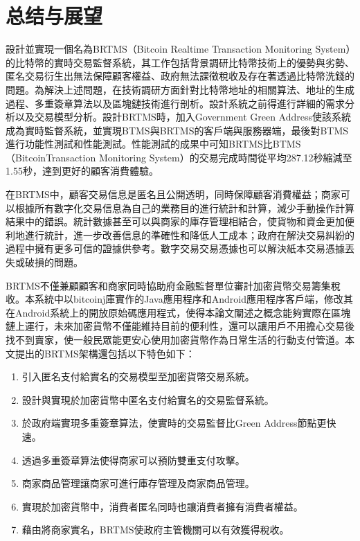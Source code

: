  
\chapter{总结与展望}
設計並實現一個名為BRTMS（Bitcoin Realtime Transaction Monitoring System）的比特幣的實時交易監督系統，其工作包括背景調研比特幣技術上的優勢與劣勢、匿名交易衍生出無法保障顧客權益、政府無法課徵稅收及存在著透過比特幣洗錢的問題。為解決上述問題，在技術調研方面針對比特幣地址的相關算法、地址的生成過程、多重簽章算法以及區塊鏈技術進行剖析。設計系統之前得進行詳細的需求分析以及交易模型分析。設計BRTMS時，加入Government Green Address使該系統成為實時監督系統，並實現BTMS與BRTMS的客戶端與服務器端，最後對BTMS進行功能性測試和性能測試。性能測試的成果中可知BRTMS比BTMS（BitcoinTransaction Monitoring System）的交易完成時間從平均287.12秒縮減至1.55秒，達到更好的顧客消費體驗。

在BRTMS中，顧客交易信息是匿名且公開透明，同時保障顧客消費權益；商家可以根據所有數字化交易信息為自己的業務目的進行統計和計算，減少手動操作計算結果中的錯誤。統計數據甚至可以與商家的庫存管理相結合，使貨物和資金更加便利地進行統計，進一步改善信息的準確性和降低人工成本；政府在解決交易糾紛的過程中擁有更多可信的證據供參考。數字交易交易憑據也可以解決紙本交易憑據丟失或破損的問題。

BRTMS不僅兼顧顧客和商家同時協助府金融監督單位審計加密貨幣交易籌集稅收。本系統中以bitcoinj庫實作的Java應用程序和Android應用程序客戶端，修改其在Android系統上的開放原始碼應用程式，使得本論文闡述之概念能夠實際在區塊鏈上運行，未來加密貨幣不僅能維持目前的便利性，還可以讓用戶不用擔心交易後找不到賣家，使一般民眾能更安心使用加密貨幣作為日常生活的行動支付管道。本文提出的BRTMS架構還包括以下特色如下：

		\begin{enumerate}
			\item 引入匿名支付給實名的交易模型至加密貨幣交易系統。
			\item 設計與實現於加密貨幣中匿名支付給實名的交易監督系統。
			\item 於政府端實現多重簽章算法，使實時的交易監督比Green Address節點更快速。
			\item 透過多重簽章算法使得商家可以預防雙重支付攻擊。
			\item 商家商品管理讓商家可進行庫存管理及商家商品管理。
			\item 實現於加密貨幣中，消費者匿名同時也讓消費者擁有消費者權益。
			\item 藉由將商家實名，BRTMS使政府主管機關可以有效獲得稅收。
		\end{enumerate}


